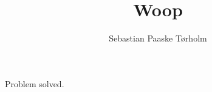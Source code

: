 \documentclass[11pt,a4paper]{article}
\title{Woop}
\author{Sebastian Paaske Tørholm}
\begin{document}
\maketitle

Problem solved.
\end{document}

